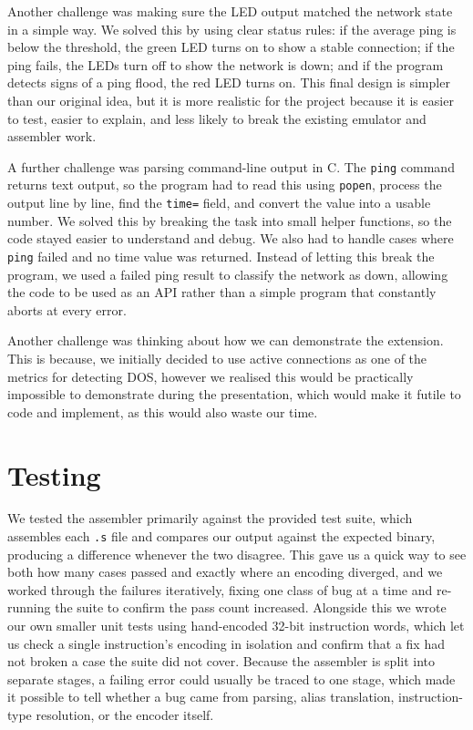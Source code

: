 \documentclass[11pt]{article}
\newcommand{\code}[1]{\texttt{#1}}
\begin{document}
Another challenge was making sure the LED output matched the network state in a simple way. We solved this by using clear status rules: if the average ping is below the threshold, the green LED turns on to show a stable connection; if the ping fails, the LEDs turn off to show the network is down; and if the program detects signs of a ping flood, the red LED turns on. This final design is simpler than our original idea, but it is more realistic for the project because it is easier to test, easier to explain, and less likely to break the existing emulator and assembler work.

A further challenge was parsing command-line output in C. The \code{ping} command returns text output, so the program had to read this using \code{popen}, process the output line by line, find the \code{time=} field, and convert the value into a usable number. We solved this by breaking the task into small helper functions, so the code stayed easier to understand and debug. We also had to handle cases where \code{ping} failed and no time value was returned. Instead of letting this break the program, we used a failed ping result to classify the network as down, allowing the code to be used as an API rather than a simple program that constantly aborts at every error.

Another challenge was thinking about how we can demonstrate the extension. This is because, we initially decided to use active connections as one of the metrics for detecting DOS, however we realised this would be practically impossible to demonstrate during the presentation, which would make it futile to code and implement, as this would also waste our time. 

\section{Testing}

We tested the assembler primarily against the provided test suite, which assembles each \code{.s} file and compares our output against the expected binary, producing a difference whenever the two disagree. This gave us a quick way to see both how many cases passed and exactly where an encoding diverged, and we worked through the failures iteratively, fixing one class of bug at a time and re-running the suite to confirm the pass count increased. Alongside this we wrote our own smaller unit tests using hand-encoded 32-bit instruction words, which let us check a single instruction's encoding in isolation and confirm that a fix had not broken a case the suite did not cover. Because the assembler is split into separate stages, a failing error could usually be traced to one stage, which made it possible to tell whether a bug came from parsing, alias translation, instruction-type resolution, or the encoder itself.
\end{document}
